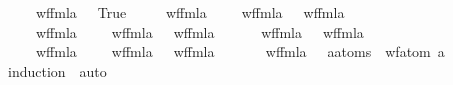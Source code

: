 \begin{isabellebody}
\ \ \ \ {\isacharbar}{\kern0pt}\ {\isachardoublequoteopen}wf{\isacharunderscore}{\kern0pt}fmla\ {\isacharparenleft}{\kern0pt}{\isasymbottom}{\isacharparenright}{\kern0pt}\ {\isasymlongleftrightarrow}\ True{\isachardoublequoteclose}\isanewline
\ \ \ \ {\isacharbar}{\kern0pt}\ {\isachardoublequoteopen}wf{\isacharunderscore}{\kern0pt}fmla\ {\isacharparenleft}{\kern0pt}{\isasymphi}{}\ \isactrlbold {\isasymand}\ {\isasymphi}{}{\isacharparenright}{\kern0pt}\ {\isasymlongleftrightarrow}\ {\isacharparenleft}{\kern0pt}wf{\isacharunderscore}{\kern0pt}fmla\ {\isasymphi}{}\ {\isasymand}\ wf{\isacharunderscore}{\kern0pt}fmla\ {\isasymphi}{}{\isacharparenright}{\kern0pt}{\isachardoublequoteclose}\isanewline
\ \ \ \ {\isacharbar}{\kern0pt}\ {\isachardoublequoteopen}wf{\isacharunderscore}{\kern0pt}fmla\ {\isacharparenleft}{\kern0pt}{\isasymphi}{}\ \isactrlbold {\isasymor}\ {\isasymphi}{}{\isacharparenright}{\kern0pt}\ {\isasymlongleftrightarrow}\ {\isacharparenleft}{\kern0pt}wf{\isacharunderscore}{\kern0pt}fmla\ {\isasymphi}{}\ {\isasymand}\ wf{\isacharunderscore}{\kern0pt}fmla\ {\isasymphi}{}{\isacharparenright}{\kern0pt}{\isachardoublequoteclose}\isanewline
\ \ \ \ {\isacharbar}{\kern0pt}\ {\isachardoublequoteopen}wf{\isacharunderscore}{\kern0pt}fmla\ {\isacharparenleft}{\kern0pt}\isactrlbold {\isasymnot}{\isasymphi}{\isacharparenright}{\kern0pt}\ {\isasymlongleftrightarrow}\ wf{\isacharunderscore}{\kern0pt}fmla\ {\isasymphi}{\isachardoublequoteclose}\isanewline
\ \ \ \ {\isacharbar}{\kern0pt}\ {\isachardoublequoteopen}wf{\isacharunderscore}{\kern0pt}fmla\ {\isacharparenleft}{\kern0pt}{\isasymphi}{}\ \isactrlbold {\isasymrightarrow}\ {\isasymphi}{}{\isacharparenright}{\kern0pt}\ {\isasymlongleftrightarrow}\ {\isacharparenleft}{\kern0pt}wf{\isacharunderscore}{\kern0pt}fmla\ {\isasymphi}{}\ {\isasymand}\ wf{\isacharunderscore}{\kern0pt}fmla\ {\isasymphi}{}{\isacharparenright}{\kern0pt}{\isachardoublequoteclose}\isanewline
\isanewline
\ \ \ \ \isamarkupfalse%
\ {\isachardoublequoteopen}wf{\isacharunderscore}{\kern0pt}fmla\ {\isasymphi}\ {\isacharequal}{\kern0pt}\ {\isacharparenleft}{\kern0pt}{\isasymforall}a{\isasymin}atoms\ {\isasymphi}{\isachardot}{\kern0pt}\ wf{\isacharunderscore}{\kern0pt}atom\ a{\isacharparenright}{\kern0pt}{\isachardoublequoteclose}\isanewline
%
\isadelimproof
\ \ \ \ \ \ %
\endisadelimproof
%
\isatagproof
{}\isamarkupfalse%
\ {\isacharparenleft}{\kern0pt}induction\ {\isasymphi}{\isacharparenright}{\kern0pt}\ auto%

\end{isabellebody}
